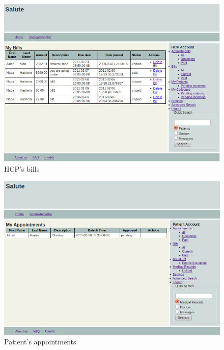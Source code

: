 \begin{figure}
\includegraphics[scale=0.6]{screenshots/doc_bills.png}
\caption{HCP's bills}
\end{figure}

\begin{figure}
\includegraphics[scale=0.6]{screenshots/Patient_appts.png}
\caption{Patient's appointments}
\end{figure}

